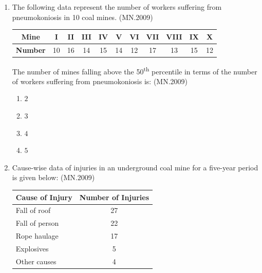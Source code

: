 \documentclass[journal]{IEEEtran}
\numberwithin{equation}{enumi}
\numberwithin{figure}{enumi}
\begin{document}
\begin{enumerate}
\begin{enumerate}[label=(\Alph*)]

\item
{}

\end{enumerate}


\item The following data represent the number of workers suffering from pneumokoniosis in 10 coal mines.
\hfill{(MN.2009)}
\begin{center}
\begin{tabular}{|c|*{10}{c}|}
\hline
\textbf{Mine} & I & II & III & IV & V & VI & VII & VIII & IX & X \\
\hline
\textbf{Number} & 10 & 16 & 14 & 15 & 14 & 12 & 17 & 13 & 15 & 12 \\
\hline
\end{tabular}
\end{center}

The number of mines falling above the 50\textsuperscript{th} percentile in terms of the number of workers suffering from pneumokoniosis is:
\hfill{(MN.2009)}
\begin{enumerate}[label=(\Alph*)]
\item $2$
\item $3$
\item $4$
\item $5$
\end{enumerate}

\item Cause-wise data of injuries in an underground coal mine for a five-year period is given below:
\hfill{(MN.2009)}

\begin{center}
\begin{tabular}{|>{\raggedright}p{6cm}|c|}
\hline
\textbf{Cause of Injury} & \textbf{Number of Injuries} \\
\hline
Fall of roof & 27 \\
Fall of person & 22 \\
Rope haulage & 17 \\
Explosives & 5 \\
Other causes & 4 \\
\hline
\end{tabular}
\end{center}


\end{enumerate}
\end{document}
